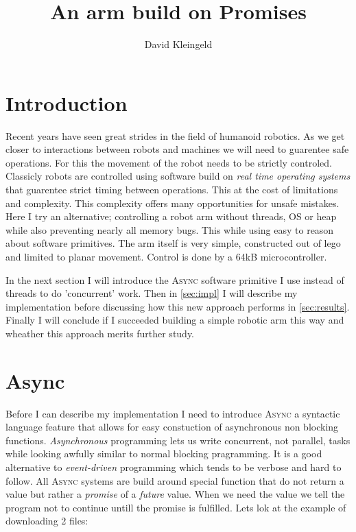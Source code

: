 \documentclass[lang=en, hanging-titles=true]{skrapport}
\title{An arm build on Promises}
\author[dskleingeld@gmail.com]{David Kleingeld}
\begin{document}
\maketitle
\tableofcontents

\section{Introduction}
Recent years have seen great strides in the field of humanoid robotics. As we get closer to interactions between robots and machines we will need to guarentee safe operations. For this the movement of the robot needs to be strictly controled. Classicly robots are controlled using software build on \textit{real time operating systems} that guarentee strict timing between operations. This at the cost of limitations and complexity. This complexity offers many opportunities for unsafe mistakes. Here I try an alternative; controlling a robot arm without threads, OS or heap while also preventing nearly all memory bugs. This while using easy to reason about software primitives. The arm itself is very simple, constructed out of lego and limited to planar movement. Control is done by a 64kB microcontroller.

In the next section I will introduce the \textsc{Async} software primitive I use instead of threads to do 'concurrent' work. Then in \cref{sec:impl} I will describe my implementation before discussing how this new approach performs in \cref{sec:results}. Finally I will conclude if I succeeded building a simple robotic arm this way and wheather this approach merits further study.

\section{Async}
Before I can describe my implementation I need to introduce \textsc{Async} a syntactic language feature that allows for easy constuction of asynchronous non blocking functions. \textit{Asynchronous} programming lets us write concurrent, not parallel, tasks while looking awfully similar to normal blocking pragramming. It is a good alternative to \textit{event-driven} programming which tends to be verbose and hard to follow. All \textsc{Async} systems are build around special function that do not return a value but rather a \textit{promise} of a \textit{future} value. When we need the value we tell the program not to continue untill the promise is fulfilled. Lets lok at the example of downloading 2 files:
\end{document}
